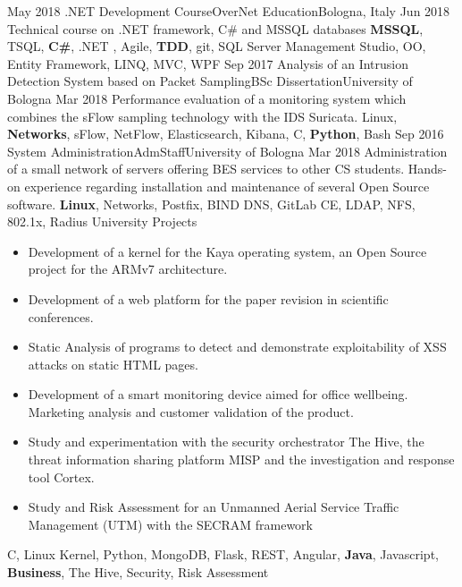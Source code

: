 \begin{experiences}
  \experience
  {May 2018}   {.NET Development Course}{OverNet Education}{Bologna, Italy}
  {Jun 2018} {
                    Technical course on .NET framework, C\# and MSSQL databases
                  }
                  {\textbf{MSSQL}, TSQL, \textbf{C\#}, .NET , Agile, \textbf{TDD}, git, SQL Server Management Studio, OO, Entity Framework, LINQ, MVC, WPF}
\emptySeparator
  \experience
    {Sep 2017}   {Analysis of an Intrusion Detection System based on Packet Sampling}{BSc Dissertation}{University of Bologna}
    {Mar 2018} {
                      Performance evaluation of a monitoring system which combines the sFlow sampling technology with the IDS Suricata.
                    }
                    {Linux, \textbf{Networks}, sFlow, NetFlow, Elasticsearch, Kibana, C, \textbf{Python}, Bash}
  \emptySeparator
  \experience
    {Sep 2016}   {System Administration}{AdmStaff}{University of Bologna}
    {Mar 2018} {
                      Administration of a small network of servers offering BES services to other CS students. \linebreak
                      Hands-on experience regarding installation and maintenance of several Open Source software.
                    }
                    {\textbf{Linux}, Networks, Postfix, BIND DNS, GitLab CE, LDAP, NFS, 802.1x, Radius}
  \emptySeparator
  \experience
    {}   {University Projects}{}{}
    {} {
                  \begin{itemize}
                    \item Development of a kernel for the Kaya operating system, an Open Source project for the ARMv7 architecture.
                    \item Development of a web platform for the paper revision in scientific conferences.
                    \item Static Analysis of programs to detect and demonstrate exploitability of XSS attacks on static HTML pages.
                    \item Development of a smart monitoring device aimed for office wellbeing. Marketing analysis and customer validation of the product.
                    \item Study and experimentation with the security orchestrator The Hive, the threat information sharing platform MISP and the investigation and response tool Cortex.
                    \item Study and Risk Assessment for an Unmanned Aerial Service Traffic Management (UTM) with the SECRAM framework
                  \end{itemize}
                }
                  {C, Linux Kernel, Python, MongoDB, Flask, REST, Angular, \textbf{Java}, Javascript, \textbf{Business}, The Hive, Security, Risk Assessment }
  \emptySeparator
\end{experiences}
